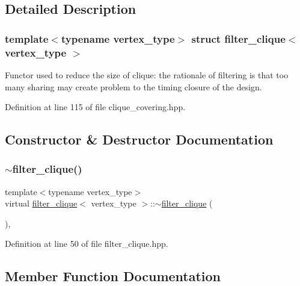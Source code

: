 \subsection{Detailed Description}
\subsubsection*{template$<$typename vertex\+\_\+type$>$\newline
struct filter\+\_\+clique$<$ vertex\+\_\+type $>$}

Functor used to reduce the size of clique\+: the rationale of filtering is that too many sharing may create problem to the timing closure of the design. 

Definition at line 115 of file clique\+\_\+covering.\+hpp.



\subsection{Constructor \& Destructor Documentation}
\mbox{\label{structfilter__clique_ad5bed84bb6e44a26d2ac630bd824bdc7}} 
\subsubsection{\texorpdfstring{$\sim$filter\+\_\+clique()}{~filter\_clique()}}
{\footnotesize\ttfamily template$<$typename vertex\+\_\+type$>$ \\
virtual \hyperlink{structfilter__clique}{filter\+\_\+clique}$<$ vertex\+\_\+type $>$\+::$\sim$\hyperlink{structfilter__clique}{filter\+\_\+clique} (\begin{DoxyParamCaption}{ }\end{DoxyParamCaption})\hspace{0.3cm}{\ttfamily [inline]}, {\ttfamily [virtual]}}



Definition at line 50 of file filter\+\_\+clique.\+hpp.



\subsection{Member Function Documentation}
\mbox{\label{structfilter__clique_aaeef789b709e45c93269c6b137ea00ff}} 

